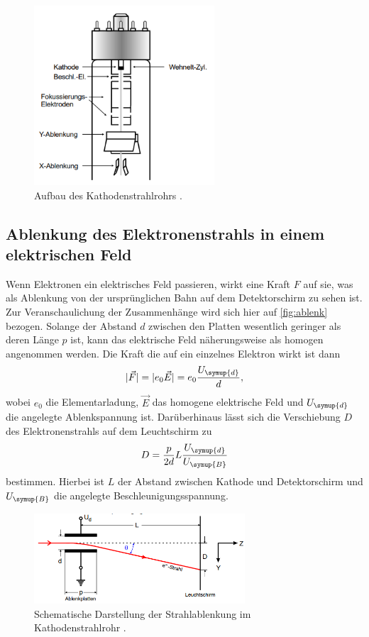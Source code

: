     \begin{figure}
        \centering
        \includegraphics[width=0.6\textwidth]{content/wehnelt.png}
        \caption{Aufbau des Kathodenstrahlrohrs \cite{V501-und-V502}.}
        \label{fig:wehnelt}
    \end{figure}

\subsection{Ablenkung des Elektronenstrahls in einem elektrischen Feld}
    Wenn Elektronen ein elektrisches Feld passieren, wirkt eine Kraft $F$ auf sie, was als Ablenkung von der ursprünglichen Bahn auf dem 
    Detektorschirm zu sehen ist. Zur Veranschaulichung der Zusammenhänge wird sich hier auf \autoref{fig:ablenk} bezogen. Solange der 
    Abstand $d$ zwischen den Platten wesentlich geringer als deren Länge $p$ ist, kann das elektrische Feld näherungsweise als
    homogen angenommen werden. Die Kraft die auf ein einzelnes Elektron wirkt ist dann
    \begin{equation}
    \label{eqn:e_kraft}
        \lvert \vec{F} \rvert = \lvert e_0 \vec{E} \rvert = e_0 \frac{U_{\symup{d}}}{d},
    \end{equation}    
    wobei $e_0$ die Elementarladung, $\vec{E}$ das homogene elektrische Feld und $U_{\symup{d}}$ die angelegte Ablenkspannung ist.
    Darüberhinaus lässt sich die Verschiebung $D$ des Elektronenstrahls auf dem Leuchtschirm zu
    \begin{equation}
    \label{eqn:e_verschiebung}
        D = \frac{p}{2 d} L \frac{U_{\symup{d}}}{U_{\symup{B}}}
    \end{equation}
    bestimmen. Hierbei ist $L$ der Abstand zwischen Kathode und Detektorschirm und $U_{\symup{B}}$ die angelegte Beschleunigungsspannung.
    \begin{figure}
        \centering
        \includegraphics[width=0.7\textwidth]{content/eablenk.png}
        \caption{Schematische Darstellung der Strahlablenkung im Kathodenstrahlrohr \cite{V501-und-V502}.}
        \label{fig:ablenk}
    \end{figure}
